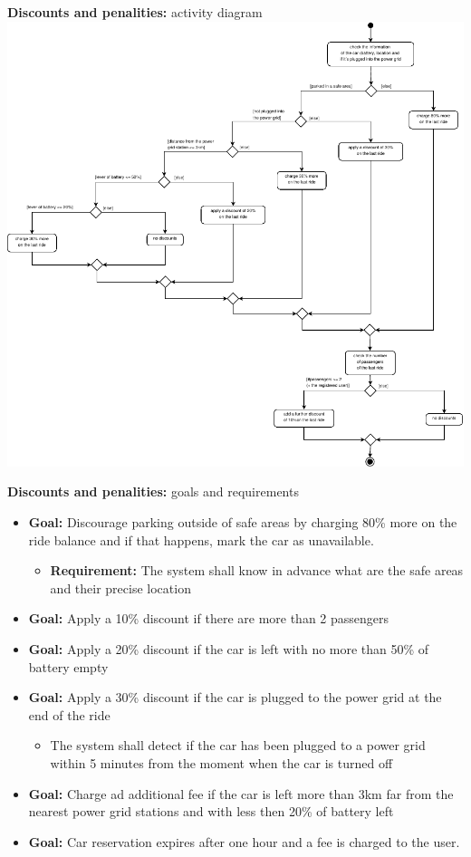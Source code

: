 \documentclass{beamer}
\begin{document}
	\begin{frame}{\textbf{Discounts and penalities:} activity diagram }
		\includegraphics[height=0.9\textheight]{figures/adDISCOUNTS.pdf}
	\end{frame}

	\begin{frame}{\textbf{Discounts and penalities:} goals and requirements}
			\begin{itemize}
				\item \textbf{Goal:} Discourage parking outside of safe areas by charging 80\% more on the ride balance and if that happens, mark the car as unavailable.
				\begin{itemize}
					\item \textbf{Requirement: } The system shall know in advance what are the safe areas and their precise location
				\end{itemize}
				\item \textbf{Goal:} Apply a 10\% discount if there are more than 2 passengers
				\item \textbf{Goal:} Apply a 20\% discount if the car is left with no more than 50\% of battery empty
				\item \textbf{Goal: } Apply a 30\% discount if the car is plugged to the power grid at the end of the ride
				\begin{itemize}
					\item The system shall detect if the car has been plugged to a power grid within 5 minutes from the moment when the car is turned off
				\end{itemize}
				\item \textbf{Goal:} Charge ad additional fee if the car is left more than 3km far from the nearest power grid stations and with less then 20\% of battery left
				\item \textbf{Goal: } Car reservation expires after one hour and a fee is charged to the user.
			\end{itemize}		
	\end{frame}
\end{document}

